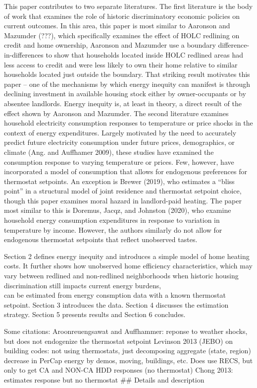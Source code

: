 \documentclass[
]{article}
\begin{document}
This paper contributes to two separate literatures. The first literature
is the body of work that examines the role of historic discriminatory
economic policies on current outcomes. In this area, this paper is most
similar to Aaronson and Mazumder (???), which specifically examines the
effect of HOLC redlining on credit and home ownership, Aaronson and
Mazumder use a boundary difference-in-differences to show that
households located inside HOLC redlined areas had less access to credit
and were less likely to own their home relative to similar households
located just outside the boundary. That striking result motivates this
paper -- one of the mechanisms by which energy inequity can manifest is
through declining investment in available housing stock either by
owner-occupants or by absentee landlords. Energy inequity is, at least
in theory, a direct result of the effect shown by Aaronson and Mazumder.
The second literature examines household electricity consumption
responses to temperature or price shocks in the context of energy
expenditures. Largely motivated by the need to accurately predict future
electricity consumption under future prices, demographics, or climate
(Ang. and Auffhamer 2009), these studies have examined the consumption
response to varying temperature or prices. Few, however, have
incorporated a model of consumption that allows for endogenous
preferences for thermostat setpoints. An exception is Brewer (2019), who
estimates a ``bliss point'' in a structural model of joint residence and
thermostat setpoint choice, though this paper examines moral hazard in
landlord-paid heating. The paper most similar to this is Doremus, Jacqz,
and Johnston (2020), who examine household energy consumption
expenditures in response to variation in temperature by income. However,
the authors similarly do not allow for endogenous thermostat setpoints
that reflect unobserved tastes.

Section 2 defines energy inequity and introduces a simple model of home
heating costs. It further shows how unobserved home efficiency
characteristics, which may vary between redlined and non-redlined
neighborhoods when historic housing discrimination still impacts current
energy burdens,\\
can be estimated from energy consmption data with a known thermostat
setpoint. Section 3 introduces the data. Section 4 discusses the
estimation strategy. Section 5 presents results and Section 6 concludes.

Some citations: Aroonreuengsawat and Auffhammer: reponse to weather
shocks, but does not endogenize the thermostat setpoint Levinson 2013
(JEBO) on building codes: not using thermostats, just decomposing
aggregate (state, region) decrease in PerCap energy by demos, moving,
buildings, etc. Does use RECS, but only to get CA and NON-CA HDD
responses (no thermostat) Chong 2013: estimates response but no
thermostat \#\# Details and description
\end{document}
